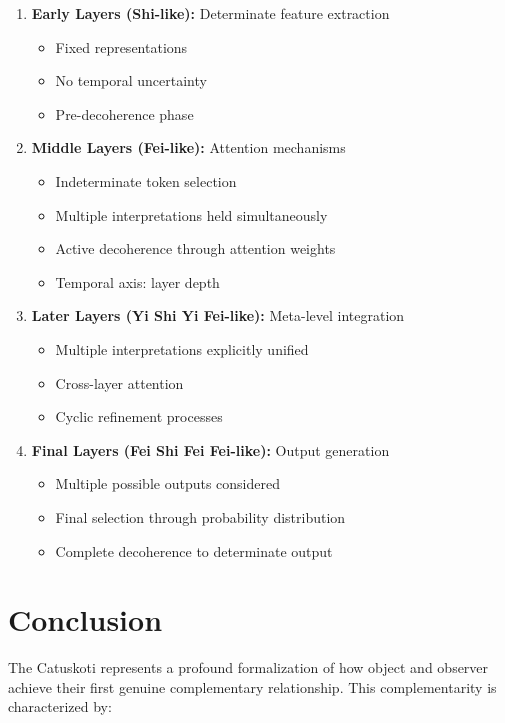 \documentclass[12pt,a4paper]{article}
\begin{document}
\begin{enumerate}
    \item \textbf{Early Layers (Shi-like):} Determinate feature extraction
    \begin{itemize}
        \item Fixed representations
        \item No temporal uncertainty
        \item Pre-decoherence phase
    \end{itemize}
    
    \item \textbf{Middle Layers (Fei-like):} Attention mechanisms
    \begin{itemize}
        \item Indeterminate token selection
        \item Multiple interpretations held simultaneously
        \item Active decoherence through attention weights
        \item Temporal axis: layer depth
    \end{itemize}
    
    \item \textbf{Later Layers (Yi Shi Yi Fei-like):} Meta-level integration
    \begin{itemize}
        \item Multiple interpretations explicitly unified
        \item Cross-layer attention
        \item Cyclic refinement processes
    \end{itemize}
    
    \item \textbf{Final Layers (Fei Shi Fei Fei-like):} Output generation
    \begin{itemize}
        \item Multiple possible outputs considered
        \item Final selection through probability distribution
        \item Complete decoherence to determinate output
    \end{itemize}
\end{enumerate}

\section{Conclusion}

The Catuskoti represents a profound formalization of how object and observer achieve their first genuine complementary relationship. This complementarity is characterized by:
\end{document}
